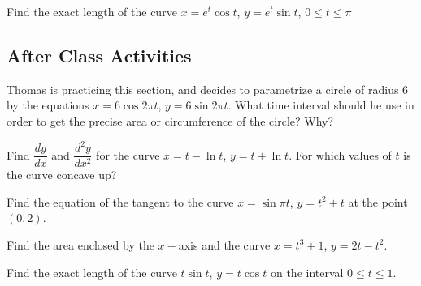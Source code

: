 \documentclass[notes2924]{subfiles}
\begin{document}
		\begin{ex}
			Find the exact length of the curve $x = e^t\cos t$, $y = e^t\sin t$, $0\leq t\leq \pi$
		\end{ex}
			\newpage
			
	\subsection*{After Class Activities}
		\begin{ex}
			Thomas is practicing this section, and decides to parametrize a circle of radius 6 by the equations $x = 6\cos 2\pi t$, $y = 6\sin 2\pi t$.  What time interval should he use in order to get the precise area or circumference of the circle?  Why?
		\end{ex}	
			
		\begin{ex}
			Find $\dfrac{dy}{dx}$ and $\dfrac{d^2y}{dx^2}$ for the curve $x = t - \ln t$, $ y=  t + \ln t$.  For which values of $t$ is the curve concave up?
		\end{ex}
			
		\begin{ex}
			Find the equation of the tangent to the curve $x = \sin \pi t$, $y = t^2 + t$ at the point $(0,2)$.
		\end{ex}
			\newpage
			
		\begin{ex}
			Find the area enclosed by the $x-$axis and the curve $x = t^3 + 1$, $y = 2t-t^2$.
		\end{ex}
			
		\begin{ex}
			Find the exact length of the curve $t\sin t$, $y =t\cos t$ on the interval $0\leq t\leq 1$.
		\end{ex}
\clearpage
\end{document}
